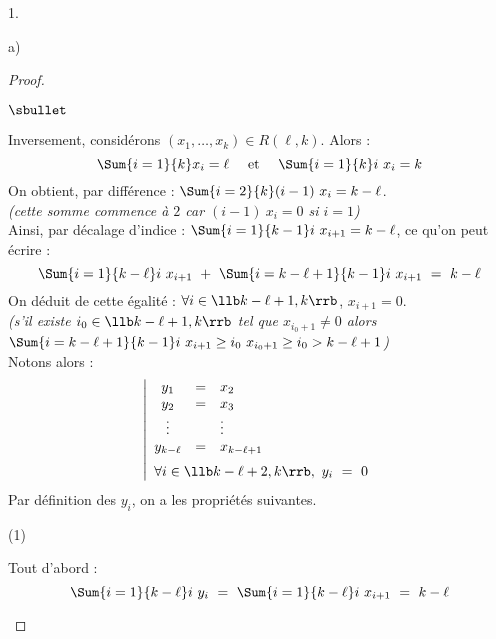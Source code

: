 \documentclass[11pt]{article}%
\begin{document}
\begin{noliste}{1.}
\begin{noliste}{a)}
\begin{proof}
\begin{noliste}{$\sbullet$}
      \item Inversement, considérons $(x_1, \ldots, x_k) \in R(\ell,
        k)$. Alors :
        \[
        \Sum{i = 1}{k} x_i = \ell \quad \text{ et } \quad \Sum{i=1}{k}
        i \ x_i = k
        \]
        On obtient, par différence : $\Sum{i=2}{k} (i-1) \ x_i = k -
        \ell$.\\
        {\it (cette somme commence à $2$ car $(i-1) \ x_i = 0$ si $i =
          1$)}\\
        Ainsi, par décalage d'indice : $\Sum{i=1}{k-1} i \ x_{i+1} = k
        - \ell$, ce qu'on peut écrire :
        \[
        \Sum{i=1}{k-\ell} i \ x_{i+1} \ + \ \Sum{i=k-\ell+1}{k-1} i \
        x_{i+1} \ = \ k - \ell
        \]
        On déduit de cette égalité : $\forall i \in \llb k-\ell+1,
        k\rrb$, $x_{i+1} = 0$.\\
        {\it (s'il existe $i_0 \in \llb k-\ell+1, k\rrb$ tel que
          $x_{i_0+1} \neq 0$ alors $\Sum{i=k-\ell+1}{k-1} i \ x_{i+1}
          \geq i_0 \ x_{i_0 + 1} \geq i_0 > k-\ell+1$)}\\
        Notons alors :
        \[
        \left|
        \begin{array}{ccl}
          y_1 & = & x_2
          \\
          y_2 & = & x_3 
          \\
          \vdots & & \vdots
          \\
          y_{k - \ell} & = & x_{k - \ell + 1}
          \\[.2cm]
          \multicolumn{3}{l}{\forall i \in \llb k - \ell + 2, k \rrb,
          \ y_i \ = \ 0}
        \end{array}
        \right.
        \]
        Par définition des $y_i$, on a les propriétés suivantes.
        \begin{noliste}{(1)}
        \item Tout d'abord :
          \[
          \Sum{i = 1}{k - \ell} i \ y_i \ = \ \Sum{i = 1}{k - \ell} i
          \ x_{i+1} \ = \ k - \ell
          \]


\end{noliste}
\end{noliste}
\end{proof}
\end{noliste}
\end{noliste}
\end{document}
